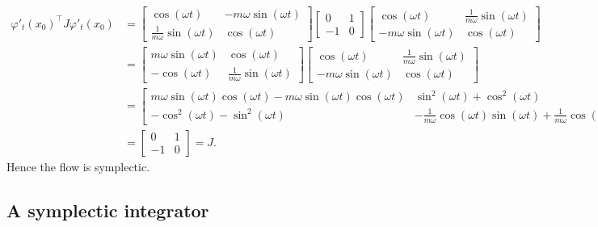 \begin{align*}
	\varphi'_t(x_0)^\top {J} \varphi'_t(x_0) &= \begin{bmatrix}
		\cos(\omega t) & -m\omega \sin(\omega t) \\
		\frac{1}{m\omega} \sin(\omega t) & \cos(\omega t)
	\end{bmatrix} \begin{bmatrix}
		0 & 1 \\
		-1 & 0
	\end{bmatrix} \begin{bmatrix}
		\cos(\omega t) & \frac{1}{m\omega} \sin(\omega t) \\
		-m\omega \sin(\omega t) & \cos(\omega t)
	\end{bmatrix} \\
	&= \begin{bmatrix}
		m \omega \sin(\omega t) & \cos(\omega t) \\
		-\cos(\omega t) & \frac{1}{m \omega} \sin(\omega t)
	\end{bmatrix} \begin{bmatrix}
		\cos(\omega t) & \frac{1}{m\omega} \sin(\omega t) \\
		-m\omega \sin(\omega t) & \cos(\omega t)
	\end{bmatrix} \\
	&= \begin{bmatrix}
		m \omega \sin(\omega t) \cos(\omega t) - m \omega \sin(\omega t) \cos(\omega t)  & \sin^2(\omega t) + \cos^2(\omega t) \\
		-\cos^2(\omega t) - \sin^2(\omega t) & -\frac{1}{m\omega}\cos(\omega t)\sin(\omega t) + \frac{1}{m \omega}\cos(\omega t)\sin(\omega t)
	\end{bmatrix} \\
	&= \begin{bmatrix}
		0 & 1 \\
		-1 & 0
	\end{bmatrix} = {J}.
\end{align*}
Hence the flow is symplectic.

\subsection{A symplectic integrator}

